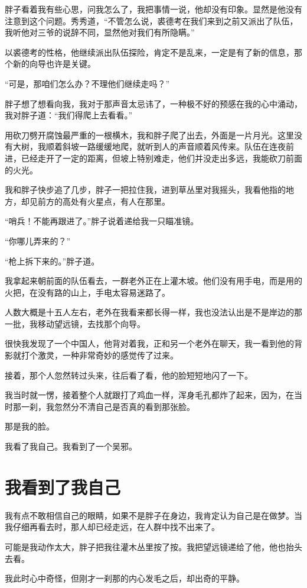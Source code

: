 胖子看着我有些心思，问我怎么了，我把事情一说，他却没有印象。显然是他没有注意到这个问题。秀秀道，“不管怎么说，裘德考在我们来到之前又派出了队伍，我听他对三爷的说辞不同，显然他对我们有所隐瞒。”

以裘德考的性格，他继续派出队伍探险，肯定不是乱来，一定是有了新的信息，那个新的向导也许是关键。

“可是，那咱们怎么办？不理他们继续走吗？”

胖子想了想看向我，我对于那声音太忌讳了，一种极不好的预感在我的心中涌动，我对胖子道：“我们得爬上去看看。”

用砍刀劈开腐蚀最严重的一根横木，我和胖子爬了出去，外面是一片月光。这里没有大树，我顺着斜坡一路缓缓地爬，就听到人的声音顺着风传来。队伍在连夜前进，已经走开了一定的距离，但坡上特别难走，他们并没走出多远，我能砍刀前面的火光。

我和胖子快步追了几步，胖子一把拉住我，进到草丛里对我摇头，我看他指的地方，却见前方的高处有火星点，有人在那里。

“哨兵！不能再跟进了。”胖子说着递给我一只瞄准镜。

“你哪儿弄来的？”

“枪上拆下来的。”胖子道。

我拿起来朝前面的队伍看去，一群老外正在上灌木坡。他们没有用手电，而是用的火把，在没有路的山上，手电太容易迷路了。

人数大概是十五人左右，老外在我看来都长得一样，我也没法认出是不是岸边的那一批，我移动望远镜，去找那个向导。

很快我发现了一个中国人，他背对着我，正和另一个老外在聊天，我一看到他的背影就打个激灵，一种非常奇妙的感觉传了过来。

接着，那个人忽然转过头来，往后看了看，他的脸短短地闪了一下。

我当时就一愣，接着整个人就跟打了鸡血一样，浑身毛孔都炸了起来，因为，在当时那一刹，我忽然分不清自己是否真的看到那张脸。

那是我的脸。

我看了我自己。我看到了一个吴邪。

\chapter{我看到了我自己}

我有点不敢相信自己的眼睛，如果不是胖子在身边，我肯定认为自己是在做梦。当我仔细再看去时，那人却已经走远，在人群中找不出来了。

可能是我动作太大，胖子把我往灌木丛里按了按。我把望远镜递给了他，他也抬头去看。

我此时心中奇怪，但刚才一刹那的内心发毛之后，却出奇的平静。

